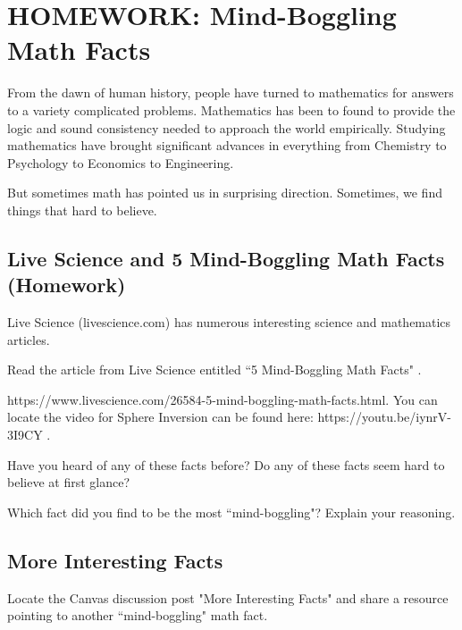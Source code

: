 
\section{HOMEWORK: Mind-Boggling Math Facts}

From the dawn of human history, people have turned to mathematics for answers to a variety complicated problems. Mathematics has been to found to provide the logic and sound consistency needed to approach the world empirically. Studying mathematics have brought significant advances in everything from Chemistry to Psychology to Economics to Engineering. 

But sometimes math has pointed us in surprising direction. Sometimes, we find things that hard to believe.

\subsection{Live Science and 5 Mind-Boggling Math Facts (Homework)} 

Live Science (livescience.com) has numerous interesting science and mathematics articles. 

\begin{exercise} 
Read the article from Live Science entitled ``5 Mind-Boggling Math Facts" \cite{livescience}.
\end{exercise}
{\footnotesize https://www.livescience.com/26584-5-mind-boggling-math-facts.html. You can locate the video for Sphere Inversion can be found here: https://youtu.be/iynrV-3I9CY \cite{sphere}.}

\vspace{.5cm}

\begin{exercise}
Have you heard of any of these facts before? Do any of these facts seem hard to believe at first glance?
\end{exercise}

\blanks
\blanks

\vspace{.5cm}

\begin{exercise}
Which fact did you find to be the most ``mind-boggling"? Explain your reasoning.
\end{exercise}

\blanks
\blanks

\subsection{More Interesting Facts} 

\begin{exercise}
Locate the Canvas discussion post "More Interesting Facts" and share a resource pointing to another ``mind-boggling" math fact.
\end{exercise}








